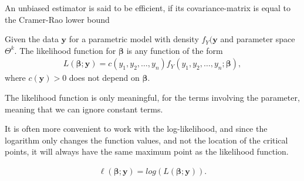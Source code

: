 \begin{definition} 
\label{def:efficient_estimator}
An unbiased estimator is said to be efficient, if its covariance-matrix is equal to the Cramer-Rao lower bound
\end{definition}

\begin{definition} 
\label{def:likelihood_function}
Given the data $\textbf{y}$ for a parametric model with density $f_Y(\textbf{y}$ and parameter space $\Theta^k$. The likelihood function for $\boldsymbol{\beta}$ is any function of the form 
\begin{align*}
    L(\boldsymbol{\beta}; \textbf{y}) = c(y_1, y_2, \ldots, y_n)f_Y(y_1, y_2, \ldots, y_n; \boldsymbol{\beta}), 
\end{align*}
where $c(\textbf{y})>0$ does not depend on $\boldsymbol{\beta}$. 
\end{definition}

The likelihood function is only meaningful, for the terms involving the parameter, meaning that we can ignore constant terms.

It is often more convenient to work with the log-likelihood, and since the logarithm only changes the function values, and not the location of the critical points, it will always have the same maximum point as the likelihood function. 

\begin{align*}
    \ell(\boldsymbol{\beta};\textbf{y})=log(L(\boldsymbol{\beta}; \textbf{y})).
\end{align*}

